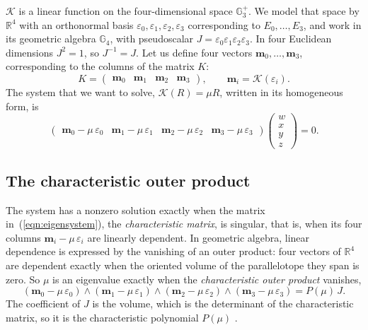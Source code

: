 \documentclass{birkjour}
\theoremstyle{definition}
\theoremstyle{remark}
\numberwithin{equation}{section}
\newcommand{\K}{\mathcal{K}}
\newcommand{\Ge}{\mathbb{G}}
\newcommand{\R}{\mathbb{R}}
\begin{document}
$\K$ is a linear function on the four-dimensional space $\Ge_3^+$. We model that space by $\R^4$ with an orthonormal basis $\varepsilon_0, \varepsilon_1, \varepsilon_2, \varepsilon_3$ corresponding to $E_0, \ldots, E_3$, and work in its geometric algebra $\Ge_4$, with pseudoscalar $J = \varepsilon_0 \varepsilon_1 \varepsilon_2 \varepsilon_3$. In four Euclidean dimensions $J^2 = 1$, so $J^{-1} = J$. Let us define four vectors $\mathbf m_0, \ldots, \mathbf m_3$, corresponding to the columns of the matrix $K$:
\begin{equation}
K = \begin{pmatrix} \mathbf m_0 & \mathbf m_1 & \mathbf m_2 & \mathbf m_3 \end{pmatrix}, \qquad \mathbf m_i = \K(\varepsilon_i).
\end{equation}
The system that we want to solve, $\K(R) = \mu R$, written in its homogeneous form, is
\begin{equation}
\label{eqn:eigensystem}
\begin{pmatrix} \mathbf m_0 - \mu\, \varepsilon_0 & \mathbf m_1 - \mu\, \varepsilon_1 & \mathbf m_2 - \mu\, \varepsilon_2 & \mathbf m_3 - \mu\, \varepsilon_3 \end{pmatrix}
\begin{pmatrix} w \\ x \\ y \\ z \end{pmatrix} = 0.
\end{equation}

\subsection{The characteristic outer product}

The system has a nonzero solution exactly when the matrix in~(\ref{eqn:eigensystem}), the \emph{characteristic matrix}, is singular, that is, when its four columns $\mathbf m_i - \mu\, \varepsilon_i$ are linearly dependent. In geometric algebra, linear dependence is expressed by the vanishing of an outer product: four vectors of $\R^4$ are dependent exactly when the oriented volume of the parallelotope they span is zero. So $\mu$ is an eigenvalue exactly when the \emph{characteristic outer product} vanishes,
\begin{equation}
\label{eqn:characteristic_outer_product}
(\mathbf m_0 - \mu\, \varepsilon_0) \wedge (\mathbf m_1 - \mu\, \varepsilon_1) \wedge (\mathbf m_2 - \mu\, \varepsilon_2) \wedge (\mathbf m_3 - \mu\, \varepsilon_3) = P(\mu)\, J.
\end{equation}
The coefficient of $J$ is the volume, which is the determinant of the characteristic matrix, so it is the characteristic polynomial $P(\mu)$ \cite{HestenesSobczyk1984}.
\end{document}
